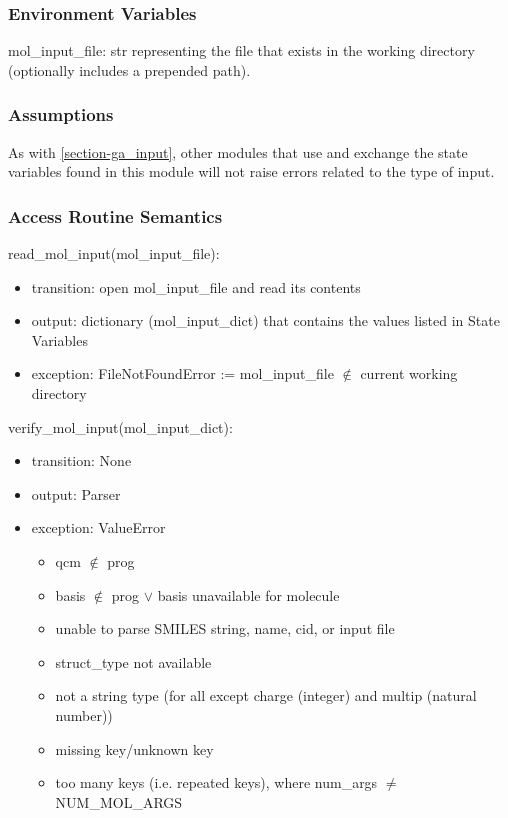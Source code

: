 \documentclass[12pt, titlepage]{article}
\begin{document}
\subsubsection{Environment Variables}

mol\_input\_file: str representing the file that exists in the working 
directory (optionally includes a prepended path).

\subsubsection{Assumptions}

As with \ref{section-ga_input}, other modules that use and exchange the state 
variables found in this module will not raise errors related to the type of 
input.

\subsubsection{Access Routine Semantics}

\noindent read\_mol\_input(mol\_input\_file):
\begin{itemize}
	\item transition: open mol\_input\_file and read its contents
	\item output: dictionary (mol\_input\_dict) that contains the values listed 
	in State Variables
	\item exception: FileNotFoundError := mol\_input\_file $\notin$ current 
	working directory
\end{itemize}

\noindent verify\_mol\_input(mol\_input\_dict):
\begin{itemize}
	\item transition: None
	\item output: Parser
	\item exception: ValueError
	\begin{itemize}
		\item qcm $\notin$ prog
		\item basis $\notin$ prog $\lor$ basis unavailable for molecule
		\item unable to parse SMILES string, name, cid, or input file
		\item struct\_type not available
		\item not a string type (for all except charge (integer) and multip 
		(natural number))
		\item missing key/unknown key
		\item too many keys (i.e. repeated keys), where num\_args $\neq$ 
		NUM\_MOL\_ARGS 
	\end{itemize}
\end{itemize}
\end{document}
